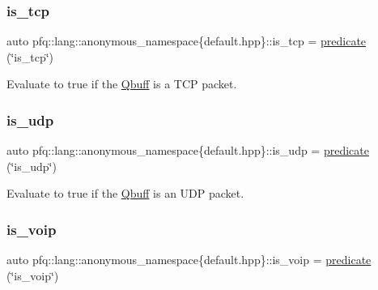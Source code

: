 \subsubsection{\texorpdfstring{is\+\_\+tcp}{is\_tcp}}
{\footnotesize\ttfamily auto pfq\+::lang\+::anonymous\+\_\+namespace\{default.\+hpp\}\+::is\+\_\+tcp = \hyperlink{namespacepfq_1_1lang_aca9adafc436b7f851621b979fa1aaf88}{predicate} (\char`\"{}is\+\_\+tcp\char`\"{})}



Evaluate to {\ttfamily true} if the \hyperlink{structpfq_1_1lang_1_1Qbuff}{Qbuff} is a T\+CP packet. 

\mbox{\label{namespacepfq_1_1lang_1_1anonymous__namespace_02default_8hpp_03_a42701f36d9dde7f3636b90244d520a16}} 
\subsubsection{\texorpdfstring{is\+\_\+udp}{is\_udp}}
{\footnotesize\ttfamily auto pfq\+::lang\+::anonymous\+\_\+namespace\{default.\+hpp\}\+::is\+\_\+udp = \hyperlink{namespacepfq_1_1lang_aca9adafc436b7f851621b979fa1aaf88}{predicate} (\char`\"{}is\+\_\+udp\char`\"{})}



Evaluate to {\ttfamily true} if the \hyperlink{structpfq_1_1lang_1_1Qbuff}{Qbuff} is an U\+DP packet. 

\mbox{\label{namespacepfq_1_1lang_1_1anonymous__namespace_02default_8hpp_03_a79aa9beec811d735d03b40f85b4773c5}} 
\subsubsection{\texorpdfstring{is\+\_\+voip}{is\_voip}}
{\footnotesize\ttfamily auto pfq\+::lang\+::anonymous\+\_\+namespace\{default.\+hpp\}\+::is\+\_\+voip = \hyperlink{namespacepfq_1_1lang_aca9adafc436b7f851621b979fa1aaf88}{predicate} (\char`\"{}is\+\_\+voip\char`\"{})}



